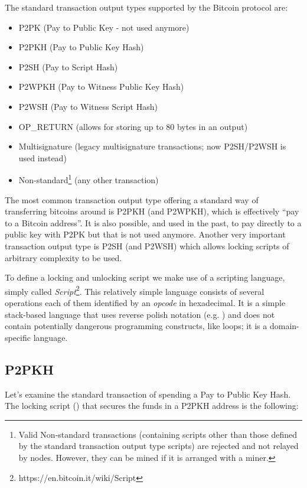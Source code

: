 The standard transaction output types supported by the Bitcoin protocol are:

\begin{itemize}
\item P2PK (Pay to Public Key - not used anymore)
\item P2PKH (Pay to Public Key Hash)
\item P2SH (Pay to Script Hash)
\item P2WPKH (Pay to Witness Public Key Hash)
\item P2WSH (Pay to Witness Script Hash)
\item OP\_RETURN (allows for storing up to 80 bytes in an output)
\item Multisignature (legacy multisignature transactions; now P2SH/P2WSH is used instead)
\item Non-standard\footnote{Valid Non-standard transactions (containing scripts other than those defined by the standard transaction output type scripts) are rejected and not relayed by nodes. However, they can be mined if it is arranged with a miner.} (any other transaction)
\end{itemize}

The most common transaction output type offering a standard way of transferring bitcoins around is P2PKH (and P2WPKH), which is effectively ``pay to a Bitcoin address''. It is also possible, and used in the past, to pay directly to a public key with P2PK but that is not used anymore. Another very important transaction output type is P2SH (and P2WSH) which allows locking scripts of arbitrary complexity to be used.

To define a locking and unlocking script we make use of a scripting language, simply called \emph{Script}\footnote{https://en.bitcoin.it/wiki/Script}. This relatively simple language consists of several operations each of them identified by an \emph{opcode} in hexadecimal. It is a simple stack-based language that uses reverse polish notation (e.g. ) and does not contain potentially dangerous programming constructs, like loops; it is a domain-specific language.

\subsection*{P2PKH}

Let’s examine the standard transaction of spending a Pay to Public Key Hash. The locking script () that secures the funds in a P2PKH address is the following:

